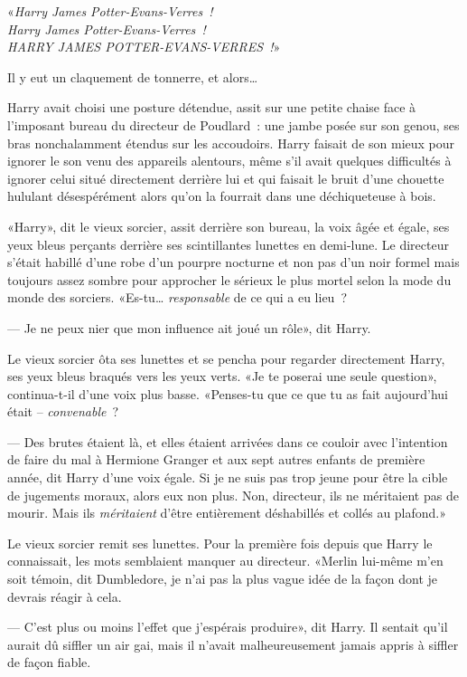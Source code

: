 «\emph{Harry James Potter-Evans-Verres~!\\
Harry James Potter-Evans-Verres~!\\
HARRY JAMES POTTER-EVANS-VERRES~!}»

Il y eut un claquement de tonnerre, et alors…

\later

Harry avait choisi une posture détendue, assit sur une petite chaise face à l'imposant bureau du directeur de Poudlard~: une jambe posée sur son genou, ses bras nonchalamment étendus sur les accoudoirs. Harry faisait de son mieux pour ignorer le son venu des appareils alentours, même s'il avait quelques difficultés à ignorer celui situé directement derrière lui et qui faisait le bruit d'une chouette hululant désespérément alors qu'on la fourrait dans une déchiqueteuse à bois.

«Harry», dit le vieux sorcier, assit derrière son bureau, la voix âgée et égale, ses yeux bleus perçants derrière ses scintillantes lunettes en demi-lune. Le directeur s'était habillé d'une robe d'un pourpre nocturne et non pas d'un noir formel mais toujours assez sombre pour approcher le sérieux le plus mortel selon la mode du monde des sorciers. «Es-tu… \emph{responsable} de ce qui a eu lieu~?

--- Je ne peux nier que mon influence ait joué un rôle», dit Harry.

Le vieux sorcier ôta ses lunettes et se pencha pour regarder directement Harry, ses yeux bleus braqués vers les yeux verts. «Je te poserai une seule question», continua-t-il d'une voix plus basse. «Penses-tu que ce que tu as fait aujourd'hui était -- \emph{convenable}~?

--- Des brutes étaient là, et elles étaient arrivées dans ce couloir avec l'intention de faire du mal à Hermione Granger et aux sept autres enfants de première année, dit Harry d'une voix égale. Si je ne suis pas trop jeune pour être la cible de jugements moraux, alors eux non plus. Non, directeur, ils ne méritaient pas de mourir. Mais ils \emph{méritaient} d'être entièrement déshabillés et collés au plafond.»

Le vieux sorcier remit ses lunettes. Pour la première fois depuis que Harry le connaissait, les mots semblaient manquer au directeur. «Merlin lui-même m'en soit témoin, dit Dumbledore, je n'ai pas la plus vague idée de la façon dont je devrais réagir à cela.

--- C'est plus ou moins l'effet que j'espérais produire», dit Harry. Il sentait qu'il aurait dû siffler un air gai, mais il n'avait malheureusement jamais appris à siffler de façon fiable.

